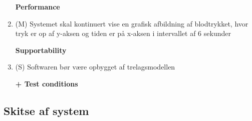\begin{enumerate}
\textbf{Performance}
\item (M) Systemet skal kontinuert vise en grafisk afbildning af blodtrykket, hvor tryk er op af y-aksen og tiden er på x-aksen i intervallet af 6 sekunder 

\textbf{Supportability}
\item (S) Softwaren bør være opbygget af trelagsmodellen

\textbf{+ Test conditions}
\end{enumerate}

\subsection{Skitse af system}

